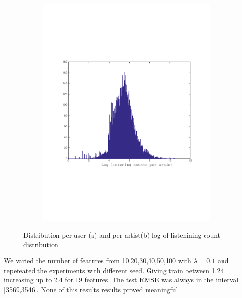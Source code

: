 \begin{figure}[h]
\begin{subfigure}[b]{0.45\textwidth}
    \includegraphics[width=\textwidth]{figures/histCountPerArtist.pdf}
    \caption{}
  \end{subfigure}
  \caption{Distribution per user (a) and per artist(b) log of listenining count distribution}
  \label{fig:new_plot}
\end{figure}

We varied the number of features from 10,20,30,40,50,100 with $\lambda = 0.1$ and repeteated the experiments with different seed.
 Giving train  between 1.24 increasing up to  2.4 for 19 features.  The test RMSE  
 was always in the interval [3569,3546]. None of this results results proved meaningful.

